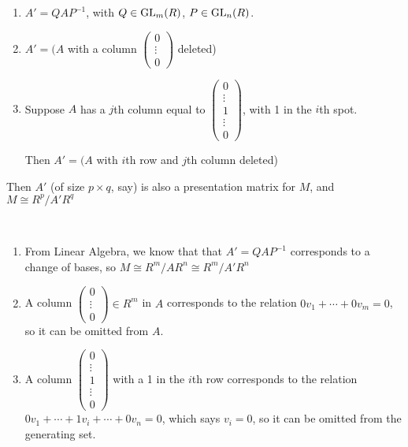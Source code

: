\documentclass[x11names,reqno,14pt]{extarticle}
\begin{document}
\begin{enumerate}[label=(\roman*)]

\item $A' = QAP^{-1}$, with $Q \in {\mathrm{GL}}_m(R)$, $P \in {\mathrm{GL}}_n(R)$. 

\item $A' = (A$ with a column $\begin{pmatrix} 0 \\ \vdots \\ 0 \end{pmatrix}$ deleted)

\item Suppose $A$ has a $j$th column equal to $\begin{pmatrix} 0 \\ \vdots \\ 1 \\ \vdots \\ 0 \end{pmatrix}$, with 1 in the $i$th spot. 

Then $A' = (A$ with $i$th row and $j$th column deleted)

\end{enumerate}

Then $A'$ (of size $p\times q$, say) is also a presentation matrix for $M$, and $M \cong R^p/A'R^q$

\proof\,

\begin{enumerate}[label=(\roman*)]

\item From Linear Algebra, we know that that $A' = QAP^{-1}$ corresponds to a change of bases, so $M \cong R^m/AR^n \cong R^m/A'R^n$

\item A column $\begin{pmatrix} 0 \\ \vdots \\ 0 \end{pmatrix} \in R^m$ in $A$ corresponds to the relation $0v_1 + \cdots + 0v_m = 0$, so it can be omitted from $A$.

\item A column $\begin{pmatrix} 0 \\ \vdots \\ 1 \\ \vdots \\ 0 \end{pmatrix}$ with a 1 in the $i$th row corresponds to the relation $0v_1 + \cdots + 1v_i + \cdots + 0v_n = 0$, which says $v_i = 0$, so it can be omitted from the generating set. 

\end{enumerate}
 
\end{document}
